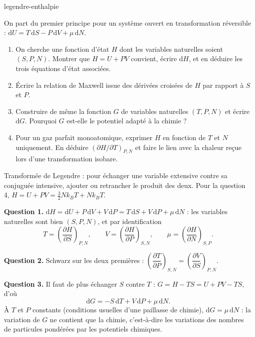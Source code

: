 \begin{exo}{legendre-enthalpie}

On part du premier principe pour un système ouvert en transformation réversible : $\mathrm{d}U = T\,\mathrm{d}S - P\,\mathrm{d}V + \mu\,\mathrm{d}N$.

\begin{enumerate}
\item On cherche une fonction d'état $H$ dont les variables naturelles soient $(S, P, N)$. Montrer que $H = U + PV$ convient, écrire $\mathrm{d}H$, et en déduire les trois équations d'état associées.
\item Écrire la relation de Maxwell issue des dérivées croisées de $H$ par rapport à $S$ et $P$.
\item Construire de même la fonction $G$ de variables naturelles $(T, P, N)$ et écrire $\mathrm{d}G$. Pourquoi $G$ est-elle le potentiel adapté à la chimie ?
\item Pour un gaz parfait monoatomique, exprimer $H$ en fonction de $T$ et $N$ uniquement. En déduire $\left(\partial H/\partial T\right)_{P,N}$ et faire le lien avec la chaleur reçue lors d'une transformation isobare.
\end{enumerate}

\begin{indication}
Transformée de Legendre : pour échanger une variable extensive contre sa conjuguée intensive, ajouter ou retrancher le produit des deux. Pour la question 4, $H = U + PV = \frac{3}{2}Nk_BT + Nk_BT$.
\end{indication}

\begin{solution}
\textbf{Question 1.} $\mathrm{d}H = \mathrm{d}U + P\,\mathrm{d}V + V\,\mathrm{d}P = T\,\mathrm{d}S + V\,\mathrm{d}P + \mu\,\mathrm{d}N$ : les variables naturelles sont bien $(S,P,N)$, et par identification
\[
T = \left(\frac{\partial H}{\partial S}\right)_{P,N}, \qquad V = \left(\frac{\partial H}{\partial P}\right)_{S,N}, \qquad \mu = \left(\frac{\partial H}{\partial N}\right)_{S,P}.
\]

\textbf{Question 2.} Schwarz sur les deux premières : $\left(\dfrac{\partial T}{\partial P}\right)_{S,N} = \left(\dfrac{\partial V}{\partial S}\right)_{P,N}$.

\textbf{Question 3.} Il faut de plus échanger $S$ contre $T$ : $G = H - TS = U + PV - TS$, d'où
\[
\mathrm{d}G = -S\,\mathrm{d}T + V\,\mathrm{d}P + \mu\,\mathrm{d}N.
\]
À $T$ et $P$ constants (conditions usuelles d'une paillasse de chimie), $\mathrm{d}G = \mu\,\mathrm{d}N$ : la variation de $G$ ne contient que la chimie, c'est-à-dire les variations des nombres de particules pondérées par les potentiels chimiques.


\end{solution}
\end{exo}
